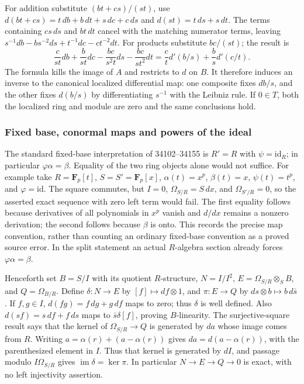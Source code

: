 For addition substitute \((bt+cs)/(st)\), use \(d(bt+cs)=t\,db+b\,dt+s\,dc+c\,ds\) and \(d(st)=t\,ds+s\,dt\). The terms containing \(cs\,ds\) and \(bt\,dt\) cancel with the matching numerator terms, leaving \(s^{-1}db-bs^{-2}ds+t^{-1}dc-ct^{-2}dt\). For products substitute \(bc/(st)\); the result is \[
\frac{c}{st}db+\frac{b}{st}dc-\frac{bc}{s^2t}ds-\frac{bc}{st^2}dt
=\frac ct d'(b/s)+\frac bs d'(c/t).
\] The formula kills the image of \(A\) and restricts to \(d\) on \(B\). It therefore induces an inverse to the canonical localized differential map: one composite fixes \(db/s\), and the other fixes \(d(b/s)\) by differentiating \(s^{-1}\) with the Leibniz rule. If \(0\in T\), both the localized ring and module are zero and the same conclusions hold.

\subsubsection{Fixed base, conormal maps and powers of the ideal}\label{fixed-base-conormal-maps-and-powers-of-the-ideal}

The standard fixed-base interpretation of 34102--34155 is \(R'=R\) with \(\psi=\mathrm{id}_R\); in particular \(\varphi\alpha=\beta\). Equality of the two ring objects alone would not suffice. For example take \(R=\mathbf F_p[t]\), \(S=S'=\mathbf F_p[x]\), \(\alpha(t)=x^p\), \(\beta(t)=x\), \(\psi(t)=t^p\), and \(\varphi=\mathrm{id}\). The square commutes, but \(I=0\), \(\Omega_{S/R}=S\,dx\), and \(\Omega_{S'/R}=0\), so the asserted exact sequence with zero left term would fail. The first equality follows because derivatives of all polynomials in \(x^p\) vanish and \(d/dx\) remains a nonzero derivation; the second follows because \(\beta\) is onto. This records the precise map convention, rather than counting an ordinary fixed-base convention as a proved source error. In the split statement an actual \(R\)-algebra section already forces \(\varphi\alpha=\beta\).

Henceforth set \(B=S/I\) with its quotient \(R\)-structure, \(N=I/I^2\), \(E=\Omega_{S/R}\otimes_S B\), and \(Q=\Omega_{B/R}\). Define \(\delta:N\to E\) by \([f]\mapsto df\otimes1\), and \(\pi:E\to Q\) by \(ds\otimes b\mapsto b\,d\bar s\). If \(f,g\in I\), \(d(fg)=f\,dg+g\,df\) maps to zero; thus \(\delta\) is well defined. Also \(d(sf)=s\,df+f\,ds\) maps to \(\bar s\delta[f]\), proving \(B\)-linearity. The surjective-square result says that the kernel of \(\Omega_{S/R}\to Q\) is generated by \(da\) whose image comes from \(R\). Writing \(a=\alpha(r)+(a-\alpha(r))\) gives \(da=d(a-\alpha(r))\), with the parenthesized element in \(I\). Thus that kernel is generated by \(dI\), and passage modulo \(I\Omega_{S/R}\) gives \(\operatorname{im}\delta=\ker\pi\). In particular \(N\to E\to Q\to0\) is exact, with no left injectivity assertion.


